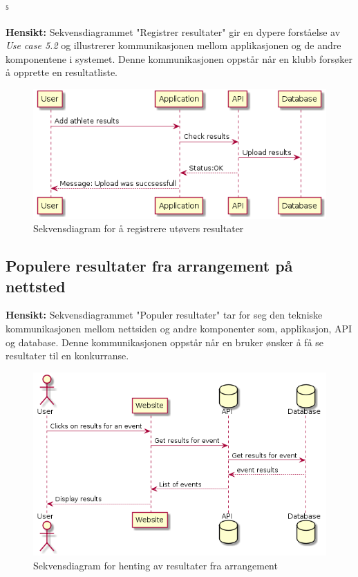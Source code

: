 ⁵\documentclass[norsk]{article}
\begin{document}
\textbf{Hensikt:} Sekvensdiagrammet "Registrer resultater" gir en dypere forståelse av \textit{Use case 5.2} og illustrerer kommunikasjonen mellom applikasjonen og de andre komponentene i systemet. Denne kommunikasjonen oppstår når en klubb forsøker å opprette en resultatliste. 
\begin{figure}[H]
\centering 
    \includegraphics[scale=0.55]{images/add-athlete-results}
    \caption{Sekvensdiagram for å registrere utøvers resultater}\label{fig:add-at-res}
\end{figure}

\subsection{Populere resultater fra arrangement på nettsted}

\textbf{Hensikt:} Sekvensdiagrammet "Populer resultater" tar for seg den tekniske kommunikasjonen mellom nettsiden og andre komponenter som, applikasjon, API og database. Denne kommunikasjonen oppstår når en bruker ønsker å få se resultater til en konkurranse.
\begin{figure}[H]
\centering 
    \includegraphics[scale=0.5]{images/get-athletes}
    \caption{Sekvensdiagram for henting av resultater fra arrangement}\label{fig:get-at-res}
\end{figure}
\end{document}

